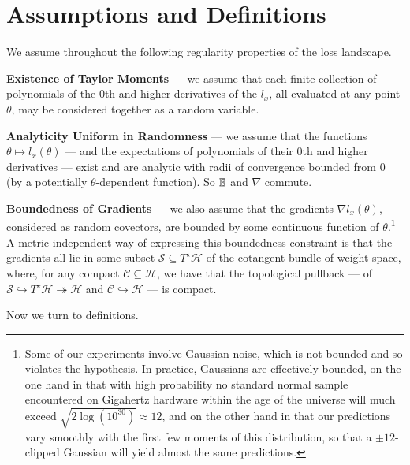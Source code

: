 \documentclass[openany, notitlepage, justified]{tufte-book}
\theoremstyle{plain}
\theoremstyle{definition}
\newcommand{\Cc}{\mathcal{C}}   \newcommand{\CC}{\mathbb{C}}
\newcommand{\Hh}{\mathcal{H}}
\newcommand{\Ss}{\mathcal{S}}
\begin{document}
    \section{Assumptions and Definitions}                        \label{appendix:assumptions}
        We assume throughout the following regularity properties of
        the loss landscape.
        
        \textbf{Existence of Taylor Moments} --- we assume
        that each finite collection of polynomials of the $0$th and higher
        derivatives of the $l_x$, all evaluated at any point $\theta$, may be
        considered together as a random variable.

        \textbf{Analyticity Uniform in Randomness} --- we assume that
        the functions $\theta \mapsto l_x(\theta)$ --- and the expectations
        of polynomials of their $0$th and higher derivatives --- exist and are
        analytic with radii of convergence bounded from $0$ (by a potentially
        $\theta$-dependent function).  So $\mathbb{E}$ and $\nabla$ commute. 

        \textbf{Boundedness of Gradients} --- we also assume that the gradients
        $\nabla l_x(\theta)$, considered as random covectors, are bounded by
        some continuous function of $\theta$.\footnote{
            Some of our experiments involve Gaussian noise, which is not
            bounded and so violates the hypothesis.  In practice, Gaussians are
            effectively bounded, on the one hand in that with high
            probability no standard normal sample encountered on Gigahertz
            hardware within the age of the universe will much exceed $\sqrt{2
            \log(10^{30})} \approx 12$, and on the other hand in that
            our predictions vary smoothly with the first few moments of this
            distribution, so that a $\pm 12$-clipped Gaussian will yield almost
            the same predictions.
        }
        A metric-independent way of expressing this boundedness constraint
        is that the gradients all lie in some subset $\Ss \subseteq T^\star\Hh$ of
        the cotangent bundle of weight space, where, for any compact $\Cc
        \subseteq \Hh$, we have that the topological pullback --- of
        $\Ss \hookrightarrow T^\star\Hh \twoheadrightarrow \Hh$
        and
        $\Cc \hookrightarrow \Hh$ ---
        is compact.
        
        Now we turn to definitions.
\end{document}
